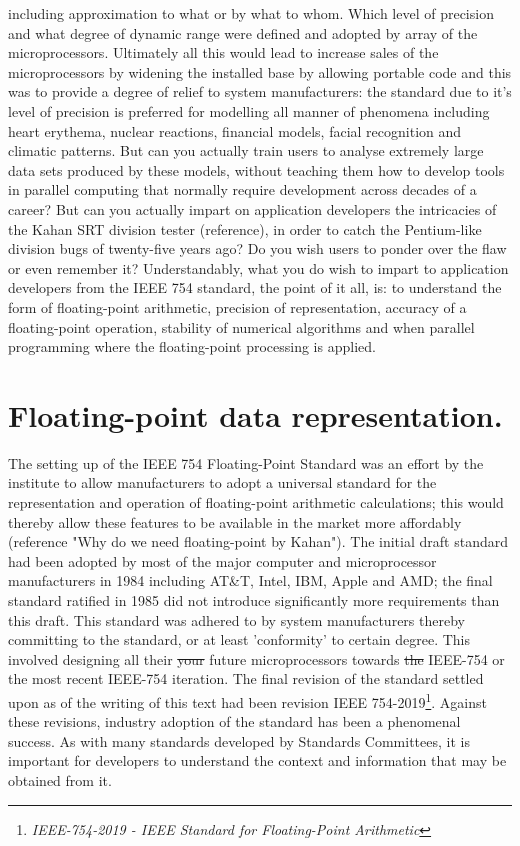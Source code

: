 \documentclass[7pt]{article}
\begin{document}
including approximation to what or by what to whom. Which level of precision and what degree of dynamic range were defined and adopted by array of the microprocessors. Ultimately all this would lead to increase sales of the microprocessors by widening the installed base by allowing portable code and this was to provide a degree of relief to system manufacturers: the standard due to it's level of precision is preferred for modelling all manner of phenomena including heart erythema, nuclear reactions, financial models, facial recognition and climatic patterns. But can you actually train users to analyse  extremely large data sets produced by these models, without teaching them how to develop tools in parallel computing that normally require development across decades of a career? But can you actually impart on application developers the intricacies of the Kahan SRT division tester (reference), in order to catch the Pentium-like division bugs of twenty-five years ago? Do you wish users to ponder over the flaw or even remember it? Understandably, what you do wish to impart to application developers from the IEEE 754 standard, the point of it all, is: to understand the form of floating-point arithmetic, precision of representation, accuracy of a floating-point operation, stability of numerical algorithms and when parallel programming where the floating-point processing is applied. 

\section*{Floating-point data representation.}  

The setting up of the IEEE 754 Floating-Point Standard was an effort by the institute to allow  manufacturers to adopt a universal standard for the representation and operation of floating-point arithmetic calculations; this would thereby allow these features to be available in the market more affordably (reference "Why do we need floating-point by Kahan"). The initial  draft standard had been adopted by most of the major computer and microprocessor manufacturers in 1984  including AT\&T, Intel, IBM, Apple and AMD; the final standard ratified in 1985 did not introduce significantly more requirements than this draft. This standard was adhered to by system manufacturers thereby committing to the standard, or at least 'conformity' to certain degree. This involved designing all their \st{your} future microprocessors towards \st{the} IEEE-754 or the most recent IEEE-754 iteration. The final revision of the standard settled upon as of the writing of this text had been revision IEEE 754-2019\footnote{\textit{IEEE-754-2019 - IEEE Standard for Floating-Point Arithmetic}}. Against these revisions, industry adoption of the standard has been a phenomenal success. As with many standards developed by Standards Committees, it is important for developers to understand the context and information that may be obtained from it.
\end{document}
